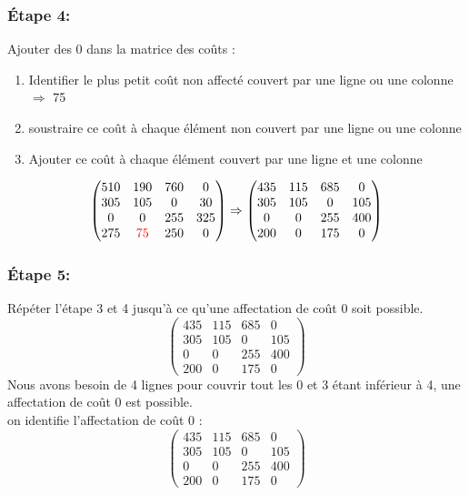 \documentclass{article}
\begin{document}
\subsubsection*{Étape 4:} Ajouter des 0 dans la matrice des coûts : \\
\begin{enumerate}
    \item Identifier le plus petit coût non affecté couvert par une ligne ou une colonne $\Rightarrow$ 75 
    \item soustraire ce coût à chaque élément non couvert par une ligne ou une colonne 
    \item Ajouter ce coût à chaque élément couvert par une ligne et une colonne 
\end{enumerate}
$$\begin{pmatrix}
510 & 190 & 760 & 0 \\
305 & 105 & 0 & 30\\
0 & 0 & 255 & 325\\
275 & \textcolor{red}{75} & 250 & 0
\end{pmatrix}
\Rightarrow
\begin{pmatrix}
    435 & 115 & 685 & 0 \\
    305 & 105 & 0 & 105\\
    0 & 0 & 255 & 400\\
    200 & 0 & 175 & 0
\end{pmatrix}$$

\subsubsection*{Étape 5:} Répéter l'étape 3 et 4 jusqu'à ce qu'une affectation de coût 0 soit possible.
$$\begin{pmatrix}
    435 & 115 & 685 & 0 \\
    305 & 105 & 0 & 105\\
    0 & 0 & 255 & 400\\
    200 & 0 & 175 & 0
\end{pmatrix}$$
Nous avons besoin de 4 lignes pour couvrir tout les 0  et 3 étant inférieur à 4, une affectation de coût 0 est possible.\\

on identifie l'affectation de coût 0 :
$$\begin{pmatrix}
    435 & 115 & 685 & 0 \\
    305 & 105 & 0 & 105\\
    0 & 0 & 255 & 400\\
    200 & 0 & 175 & 0
\end{pmatrix}$$
\end{document}
